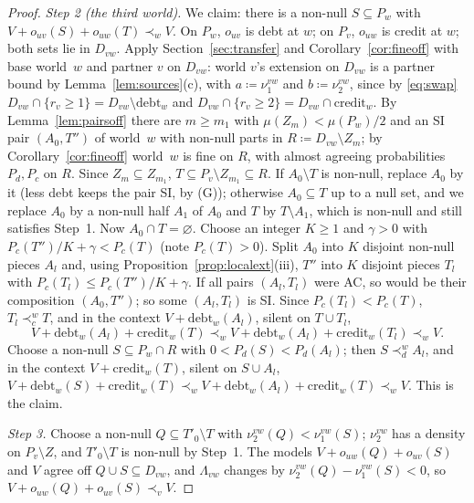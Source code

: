 \documentclass[11pt]{article}
\theoremstyle{definition}\newtheorem{definition}[theorem]{Definition}
\theoremstyle{remark}\newtheorem{remark}[theorem]{Remark}
\newcommand{\debt}{\mathrm{debt}}
\newcommand{\cred}{\mathrm{credit}}
\begin{document}
\begin{proof}
\emph{Step 2 (the third world).} We claim: there is a non-null
$S\subseteq P_w$ with $V+o_{uv}(S)+o_{uw}(T)\prec_wV$. On $P_w$, $o_{uv}$ is
debt at $w$; on $P_v$, $o_{uw}$ is credit at $w$; both sets lie in $D_{vw}$.
Apply Section~\ref{sec:transfer} and Corollary~\ref{cor:fineoff} with base
world~$w$ and partner $v$ on $D_{vw}$: world $v$'s extension on $D_{vw}$ is a
partner bound by Lemma~\ref{lem:sources}(c), with $a\coloneqq\nu^{vw}_1$ and
$b\coloneqq\nu^{vw}_2$, since by \eqref{eq:swap}
$D_{vw}\cap\{r_v\ge1\}=D_{vw}\setminus\debt_w$ and
$D_{vw}\cap\{r_v\ge2\}=D_{vw}\cap\cred_w$. By Lemma~\ref{lem:pairsoff} there
are $m\ge m_1$ with $\mu(Z_m)<\mu(P_w)/2$ and an SI pair $(A_0,T'')$ of
world~$w$ with non-null parts in $R\coloneqq D_{vw}\setminus Z_m$; by
Corollary~\ref{cor:fineoff} world~$w$ is fine on $R$, with almost agreeing
probabilities $P_d,P_c$ on $R$. Since $Z_m\subseteq Z_{m_1}$,
$T\subseteq P_v\setminus Z_{m_1}\subseteq R$. If $A_0\setminus T$ is
non-null, replace $A_0$ by it (less debt keeps the pair SI, by (G));
otherwise $A_0\subseteq T$ up to a null set, and we replace $A_0$ by a
non-null half $A_1$ of $A_0$ and $T$ by $T\setminus A_1$, which is non-null
and still satisfies Step~1. Now $A_0\cap T=\varnothing$. Choose an integer
$K\ge1$ and $\gamma>0$ with $P_c(T'')/K+\gamma<P_c(T)$ (note $P_c(T)>0$).
Split $A_0$ into $K$ disjoint non-null pieces $A_l$ and, using
Proposition~\ref{prop:localext}(iii), $T''$ into $K$ disjoint pieces $T_l$
with $P_c(T_l)\le P_c(T'')/K+\gamma$. If all pairs $(A_l,T_l)$ were AC, so
would be their composition $(A_0,T'')$; so some $(A_l,T_l)$ is SI. Since
$P_c(T_l)<P_c(T)$, $T_l\prec^w_cT$, and in the context
$V+\debt_w(A_l)$, silent on $T\cup T_l$,
\[
 V+\debt_w(A_l)+\cred_w(T)\prec_wV+\debt_w(A_l)+\cred_w(T_l)\prec_wV.
\]
Choose a non-null $S\subseteq P_w\cap R$ with $0<P_d(S)<P_d(A_l)$; then
$S\prec^w_dA_l$, and in the context $V+\cred_w(T)$, silent on $S\cup A_l$,
$V+\debt_w(S)+\cred_w(T)\prec_wV+\debt_w(A_l)+\cred_w(T)\prec_wV$. This is
the claim.

\emph{Step 3.} Choose a non-null $Q\subseteq T'_0\setminus T$ with
$\nu^{vw}_2(Q)<\nu^{vw}_1(S)$; $\nu^{vw}_2$ has a density on $P_v\setminus Z$,
and $T'_0\setminus T$ is non-null by Step~1. The models
$V+o_{uw}(Q)+o_{uv}(S)$ and $V$ agree off $Q\cup S\subseteq D_{vw}$, and
$\Lambda_{vw}$ changes by $\nu^{vw}_2(Q)-\nu^{vw}_1(S)<0$, so
$V+o_{uw}(Q)+o_{uv}(S)\prec_vV$.


\end{proof}
\end{document}
